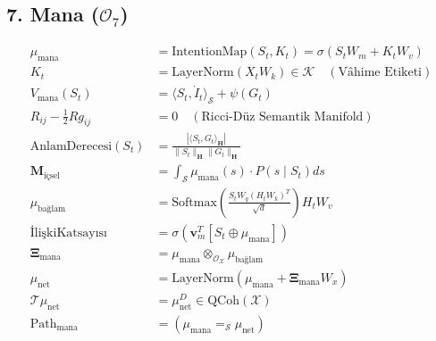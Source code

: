 \documentclass[11pt, a4paper]{article}
\begin{document}
\subsection{7. Mana ($\mathcal{O}_7$)}
\begin{align}
\mu_{\text{mana}} &= \text{IntentionMap}(S_t, K_t) = \sigma(S_t W_m + K_t W_v) \\
K_t &= \text{LayerNorm}(X_t W_k) \in \mathcal{K} \quad (\text{Vâhime Etiketi}) \\
V_{\text{mana}}(S_t) &= \langle S_t, \dot{I}_t \rangle_{\mathcal{S}} + \psi(G_t) \\
R_{ij} - \frac{1}{2} R g_{ij} &= 0 \quad (\text{Ricci-Düz Semantik Manifold}) \\
\text{AnlamDerecesi}(S_t) &= \frac{|\langle S_t, G_t \rangle_{\mathbf{H}}|}{\|S_t\|_{\mathbf{H}} \|G_t\|_{\mathbf{H}}} \\
\mathbf{M}_{\text{içsel}} &= \int_{\mathcal{S}} \mu_{\text{mana}}(s) \cdot P(s \mid S_t) ds \\
\mu_{\text{bağlam}} &= \text{Softmax}\left( \frac{S_t W_q (H_t W_k)^T}{\sqrt{d}} \right) H_t W_v \\
\text{İlişkiKatsayısı} &= \sigma(\mathbf{v}_m^T [S_t \oplus \mu_{\text{mana}}]) \\
\mathbf{\Xi}_{\text{mana}} &= \mu_{\text{mana}} \otimes_{\mathcal{O}_{\mathcal{X}}} \mu_{\text{bağlam}} \\
\mu_{\text{net}} &= \text{LayerNorm}(\mu_{\text{mana}} + \mathbf{\Xi}_{\text{mana}} W_x) \\
\mathcal{T}\mu_{\text{net}} &= \mu_{\text{net}}^D \in \text{QCoh}(\mathcal{X}) \\
\text{Path}_{\text{mana}} &= (\mu_{\text{mana}} =_{\mathcal{S}} \mu_{\text{net}})
\end{align}
\end{document}
